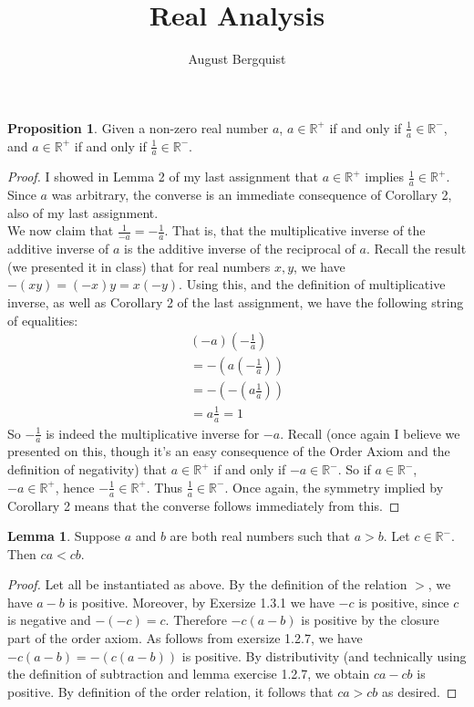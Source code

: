 \documentclass[11pt]{article}
\title{Real Analysis}
\author{August Bergquist}
\newcommand{\R}{\mathbb{R}}
\newcommand{\recip}[1]{\frac{1}{#1}}
\theoremstyle{definition}
\newtheorem{proposition}{Proposition}
\newtheorem{lemma}{Lemma}
\begin{document}
\maketitle

\begin{proposition}
Given a non-zero real number $a$, $a\in \R^+$ if and only if $ \recip{a}\in \R^-$, and $a\in \R^+$ if and only if $\recip{a}\in \R^-$.
\end{proposition}

\begin{proof}
I showed in Lemma 2 of my last assignment that $a\in \R^+$ implies $\recip{a}\in \R^+$. Since $a$ was arbitrary, the converse is an immediate consequence of Corollary 2, also of my last assignment.\\

We now claim that $\recip{-a} = -\recip{a}$. That is, that the multiplicative inverse of the additive inverse of $a$ is the additive inverse of the reciprocal of $a$. Recall the result (we presented it in class) that for real numbers $x,y$, we have $ -(xy) = (-x)y = x(-y)$. Using this, and the definition of multiplicative inverse, as well as Corollary 2 of the last assignment, we have the following string of equalities:
\[
\begin{array}{c}
(-a)(-\recip{a})\\
= -(a(-\recip{a}))\\
= -(-(a\recip{a}))\\
= a\recip{a} = 1
\end{array}
\]
So $ -\recip{a}$ is indeed the multiplicative inverse for $-a$. Recall (once again I believe we presented on this, though it's an easy consequence of the Order Axiom and the definition of negativity) that $a\in \R^+$ if and only if $-a\in \R^-$. So if $a\in \R^-$, $-a\in \R^+$, hence $-\recip{a} \in \R^+ $. Thus $\recip{a}\in \R^-$. Once again, the symmetry implied by Corollary 2 means that the converse follows immediately from this.
\end{proof}

\begin{lemma}
Suppose $a$ and $b$ are both real numbers such that $a > b$. Let $c \in \R^-$. Then $ca < cb$. 
\end{lemma}

\begin{proof} Let all be instantiated as above. By the definition of the relation $>$, we have $a-b$ is positive. Moreover, by Exersize 1.3.1 we have $-c$ is positive, since $c$ is negative and $-(-c) =c$. Therefore $-c(a-b)$ is positive by the closure part of the order axiom. As follows from exersize 1.2.7, we have $-c(a-b) = -(c(a-b))$ is positive. By distributivity (and technically using the definition of subtraction and lemma exercise 1.2.7, we obtain $ca - cb $ is positive. By definition of the order relation, it follows that $ca > cb $  as desired.
\end{proof}
\end{document}
